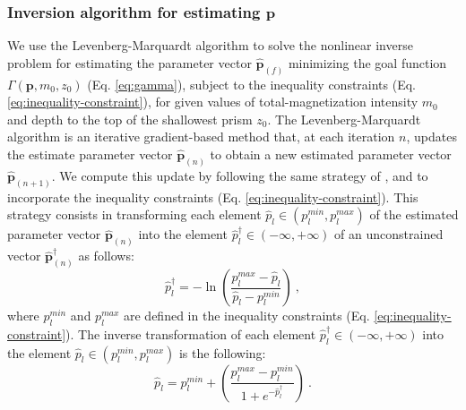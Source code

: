 \subsubsection{Inversion algorithm for estimating $\mathbf{p}$}

We use the Levenberg-Marquardt algorithm \cite[e.g., ][ p. 240]{aster-etal2019} 
to solve the nonlinear inverse problem for estimating the
parameter vector $\hat{\mathbf{p}}_{(f)}$ minimizing the goal function
$\Gamma (\mathbf{p}, m_{0}, z_{0})$ (Eq. \ref{eq:gamma}),
subject to the inequality constraints (Eq. \ref{eq:inequality-constraint}), 
for given values of total-magnetization intensity $m_{0}$ and depth to the top
of the shallowest prism $z_{0}$.
The Levenberg-Marquardt algorithm is an iterative gradient-based method that, at each iteration $n$, updates the estimate parameter vector $\hat{\mathbf{p}}_{(n)}$ to obtain a new estimated parameter vector $\hat{\mathbf{p}}_{(n + 1)}$.
We compute this update by following the same strategy of \cite{barbosa-1999b}, \cite{oliveirajr-etal2011} and \cite{oliveirajr-barbosa2013} to incorporate the inequality constraints (Eq. \ref{eq:inequality-constraint}). 
This strategy consists in transforming each element $\hat{p}_{l} \in (p_{l}^{min}, p_{l}^{max})$ of the estimated parameter vector $\hat{\mathbf{p}}_{(n)}$ 
into the element $\hat{p}^{\dagger}_{l} \in (- \infty, + \infty)$ of an 
unconstrained vector $\hat{\mathbf{p}}^{\dagger}_{(n)}$ as follows:
\begin{equation}\label{eq:inequality-function}
\hat{p}^{\dagger}_{l} = -\ln\left(\frac{p_{l}^{max} - \hat{p}_{l}}{\hat{p}_{l} - p_{l}^{min}}\right) \: ,
\end{equation}
where $p_{l}^{min}$ and $p_{l}^{max}$ are defined in the inequality constraints 
(Eq. \ref{eq:inequality-constraint}).
The inverse transformation of each element $\hat{p}^{\dagger}_{l} \in (- \infty, + \infty)$ into the element $\hat{p}_{l} \in (p_{l}^{min}, p_{l}^{max})$ is the following:
\begin{equation}\label{eq:inv-inequality-function}
\hat{p}_{l} = p_{l}^{min} + \left(\frac{p_{l}^{max} - p_{l}^{min}}{ 1 + e^{-\hat{p}^{\dagger}_{l}} }\right) \: .
\end{equation}

